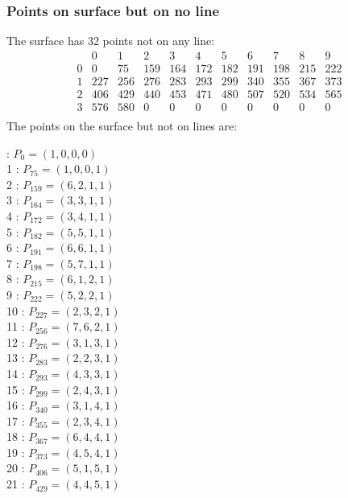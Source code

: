 \documentclass{article}
\begin{document}
{\subsubsection*{Points on surface but on no line}
The surface has 32 points not on any line:\\
$$
\begin{array}{r|*{10}{r}}
 & 0 & 1 & 2 & 3 & 4 & 5 & 6 & 7 & 8 & 9\\
\hline
0 & 0 & 75 & 159 & 164 & 172 & 182 & 191 & 198 & 215 & 222\\
1 & 227 & 256 & 276 & 283 & 293 & 299 & 340 & 355 & 367 & 373\\
2 & 406 & 429 & 440 & 453 & 471 & 480 & 507 & 520 & 534 & 565\\
3 & 576 & 580 & 0 & 0 & 0 & 0 & 0 & 0 & 0 & 0\\
\end{array}
$$
The points on the surface but not on lines are:\\
\begin{multicols}{2}
 : $P_{0}=( 1, 0, 0, 0 )$\\
1 : $P_{75}=( 1, 0, 0, 1 )$\\
2 : $P_{159}=( 6, 2, 1, 1 )$\\
3 : $P_{164}=( 3, 3, 1, 1 )$\\
4 : $P_{172}=( 3, 4, 1, 1 )$\\
5 : $P_{182}=( 5, 5, 1, 1 )$\\
6 : $P_{191}=( 6, 6, 1, 1 )$\\
7 : $P_{198}=( 5, 7, 1, 1 )$\\
8 : $P_{215}=( 6, 1, 2, 1 )$\\
9 : $P_{222}=( 5, 2, 2, 1 )$\\
10 : $P_{227}=( 2, 3, 2, 1 )$\\
11 : $P_{256}=( 7, 6, 2, 1 )$\\
12 : $P_{276}=( 3, 1, 3, 1 )$\\
13 : $P_{283}=( 2, 2, 3, 1 )$\\
14 : $P_{293}=( 4, 3, 3, 1 )$\\
15 : $P_{299}=( 2, 4, 3, 1 )$\\
16 : $P_{340}=( 3, 1, 4, 1 )$\\
17 : $P_{355}=( 2, 3, 4, 1 )$\\
18 : $P_{367}=( 6, 4, 4, 1 )$\\
19 : $P_{373}=( 4, 5, 4, 1 )$\\
20 : $P_{406}=( 5, 1, 5, 1 )$\\
21 : $P_{429}=( 4, 4, 5, 1 )$\\

\end{multicols}}
\end{document}
